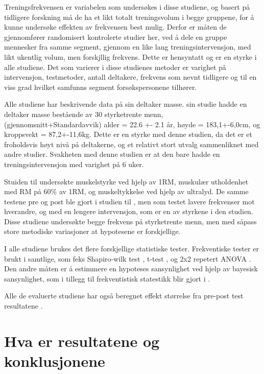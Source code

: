 \documentclass[
]{book}
\begin{document}
Treningsfrekvensen er variabelen som undersøkes i disse studiene, og basert på tidligere forskning må de ha et likt totalt treningsvolum i begge gruppene, for å kunne undersøke effekten av frekvensen best mulig. Derfor er måten de gjennomfører randomisert kontrolerte studier her, ved å dele en gruppe mennesker fra samme segment, gjennom en like lang treningsintervensjon, med likt ukentlig volum, men forskjllig frekvens. Dette er hensyntatt og er en styrke i alle studiene. Det som varierer i disse studienes metoder er varighet på intervensjon, testmetoder, antall deltakere, frekvens som nevnt tidligere og til en viss grad hvilket samfunns segment forsøkspersonene tilhører.

Alle studiene har beskrivende data på sin deltaker masse. \citep{saric2019} sin studie hadde en deltaker masse bestående av 30 styrketrente menn, (gjennomsnitt+Standardavvik) alder = 22.6 +- 2.1 år, høyde = 183,1+-6,0cm, og kroppsvekt = 87,2+-11,6kg. Dette er en styrke med denne studien, da det er et froholdsvis høyt nivå på deltakerne, og et relativt stort utvalg sammenliknet med andre studier. Svakheten med denne studien er at den bare hadde en treningsintervensjon med varighet på 6 uker.

Stuiden til \citep{saric2019} undersøkte muskelstyrke ved hjelp av 1RM, muskulær utholdenhet med RM på 60\% av 1RM, og muskeltykkelse ved hjelp av ultralyd. De samme testene pre og post ble gjort i studien til \citep{brigatto2019}, men som testet lavere frekvenser mot hverandre, og med en lengere intervensjon, som er en av styrkene i den studien. Disse studiene undersøkte begge frekvens på styrketrente menn, men med såpass store metodiske variasjoner at hypotesene er forskjellige.

I alle studiene brukes det flere forskjellige statistiske tester. Frekventiske tester er brukt i samtlige, som feks Shapiro-wilk test \citep{brigatto2019, johnsen2021, lasevicius2019}, t-test \citet{brigatto2019}, og 2x2 repetert ANOVA \citep{brigatto2019, johnsen2021} . Den andre måten er å estimmere en hypoteses sansynlighet ved hjelp av bayesisk sansynlighet, som i tillegg til frekventistisk statestikk blir gjort i \citep{saric2019}.

Alle de evaluerte studiene har også beregnet effekt størrelse fra pre-post test resultatene \citep{brigatto2019, gentil2018, johnsen2021, saric2019, lasevicius2019}.

\hypertarget{hva-er-resultatene-og-konklusjonene}{%
\section{\texorpdfstring{\textbf{Hva er resultatene og konklusjonene}}{Hva er resultatene og konklusjonene}}\label{hva-er-resultatene-og-konklusjonene}}
\end{document}
